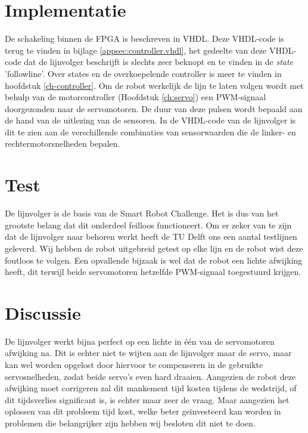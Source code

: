 \documentclass{report}
\begin{document}
\section{Implementatie}
De schakeling binnen de FPGA is beschreven in VHDL.
Deze VHDL-code is terug te vinden in bijlage \ref{appsec:controller.vhdl}, het gedeelte van deze VHDL-code dat de lijnvolger beschrijft is slechts zeer beknopt en te vinden in de \textit{state} 'followline'. 
Over states en de overkoepelende controller is meer te vinden in hoofdstuk \ref{ch-controller}.
Om de robot werkelijk de lijn te laten volgen wordt met behulp van de motorcontroller (Hoofdstuk \ref{ch:servo}) een PWM-signaal doorgezonden naar de servomotoren.
De duur van deze pulsen wordt bepaald aan de hand van de uitlezing van de sensoren.
In de VHDL-code van de lijnvolger is dit te zien aan de verschillende combinaties van sensorwaarden die de linker- en rechtermotorsnelheden bepalen.

\section{Test}
De lijnvolger is de basis van de Smart Robot Challenge.
Het is dus van het grootste belang dat dit onderdeel feilloos functioneert.
Om er zeker van te zijn dat de lijnvolger naar behoren werkt heeft de TU Delft ons een aantal testlijnen geleverd.
Wij hebben de robot uitgebreid getest op elke lijn en de robot wist deze foutloos te volgen.
Een opvallende bijzaak is wel dat de robot een lichte afwijking heeft, dit terwijl beide servomotoren hetzelfde PWM-signaal toegestuurd krijgen.

\newpage
\section{Discussie}
De lijnvolger werkt bijna perfect op een lichte in één van de servomotoren afwijking na. Dit is echter niet te wijten aan de lijnvolger maar de servo, maar kan wel worden opgelost door hiervoor te compenseren in de gebruikte servosnelheden, zodat beide servo's even hard draaien.
Aangezien de robot deze afwijking moet corrigeren zal dit mankement tijd kosten tijdens de wedstrijd, of dit tijdsverlies significant is, is echter maar zeer de vraag.
Maar aangezien het oplossen van dit probleem tijd kost, welke beter geïnvesteerd kan worden in problemen die belangrijker zijn hebben wij besloten dit niet te doen.
\end{document}
